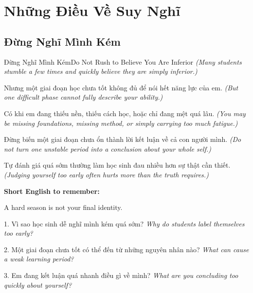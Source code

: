 \chapter{Những Điều Về Suy Nghĩ}

\section{Đừng Nghĩ Mình Kém}
\begin{truyen}{Đừng Nghĩ Mình Kém}{Do Not Rush to Believe You Are Inferior}
\textit{(Many students stumble a few times and quickly believe they are simply inferior.)}

Nhưng một giai đoạn học chưa tốt không đủ để nói hết năng lực của em.
\textit{(But one difficult phase cannot fully describe your ability.)}

Có khi em đang thiếu nền, thiếu cách học, hoặc chỉ đang mệt quá lâu.
\textit{(You may be missing foundations, missing method, or simply carrying too much fatigue.)}

Đừng biến một giai đoạn chưa ổn thành lời kết luận về cả con người mình.
\textit{(Do not turn one unstable period into a conclusion about your whole self.)}
\end{truyen}

\begin{baihoc}
Tự đánh giá quá sớm thường làm học sinh đau nhiều hơn sự thật cần thiết.
\textit{(Judging yourself too early often hurts more than the truth requires.)}
\end{baihoc}

\begin{ghinhoanh}
\textbf{Short English to remember:}

A hard season is not your final identity.

\end{ghinhoanh}

\begin{tuhocnhanh}
1. Vì sao học sinh dễ nghĩ mình kém quá sớm? \textit{Why do students label themselves too early?}

2. Một giai đoạn chưa tốt có thể đến từ những nguyên nhân nào? \textit{What can cause a weak learning period?}

3. Em đang kết luận quá nhanh điều gì về mình? \textit{What are you concluding too quickly about yourself?}
\end{tuhocnhanh}
\ngancach

